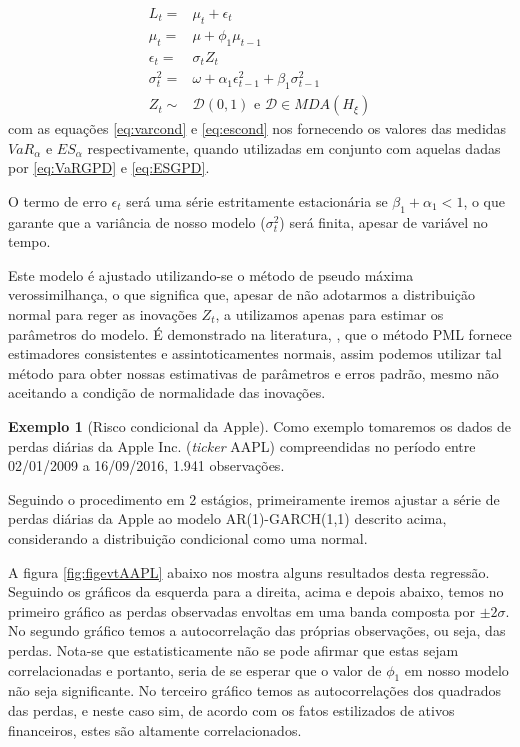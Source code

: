 \documentclass[review]{elsarticle}
\theoremstyle{definition}
\newtheorem{exemplo}[teor]{Exemplo}
\begin{document}
\begin{align}
L_t=&\mu_t+\epsilon_t \\
\mu_t=&\mu+\phi_1 \mu_{t-1} \label{eq:mut} \\
\epsilon_t=&\sigma_t Z_t\\
\sigma_t^2=&\omega+\alpha_1\epsilon_{t-1}^2+\beta_1 \sigma_{t-1}^2 \label{eq:sigma2} \\
Z_t\sim &\mathcal{D}(0,1) \text{ e } \mathcal{D} \in MDA(H_\xi)
\end{align}
com as equações \eqref{eq:varcond} e \eqref{eq:escond} nos fornecendo os valores das medidas $VaR_\alpha$ e $ES_\alpha$ respectivamente, quando utilizadas em conjunto com aquelas dadas por \eqref{eq:VaRGPD} e \eqref{eq:ESGPD}.

O termo de erro $\epsilon_t$ será uma série estritamente estacionária se $\beta_1+\alpha_1<1$, o que garante que a variância de nosso modelo ($\sigma_t^2$) será finita, apesar de variável no tempo.

Este modelo é ajustado utilizando-se o método de pseudo máxima verossimilhança, o que significa que, apesar de não adotarmos a distribuição normal para reger as inovações $Z_t$, a utilizamos apenas para estimar os parâmetros do modelo. É demonstrado na literatura, \cite[Capítulo 4]{Gourieroux1997}, que o método PML fornece estimadores consistentes e assintoticamentes normais, assim podemos utilizar tal método para obter nossas estimativas de parâmetros e erros padrão, mesmo não aceitando a condição de normalidade das inovações.

\begin{exemplo}[Risco condicional da Apple]
	\label{exe:appl}
	Como exemplo tomaremos os dados de perdas diárias da Apple Inc. (\emph{ticker} AAPL) compreendidas no período entre 02/01/2009 a 16/09/2016, 1.941 observações. 
\end{exemplo}

Seguindo o procedimento em 2 estágios, primeiramente iremos ajustar a série de perdas diárias da Apple ao modelo AR(1)-GARCH(1,1) descrito acima, considerando a distribuição condicional como uma normal. 

A figura \ref{fig:figevtAAPL} abaixo nos mostra alguns resultados desta regressão. Seguindo os gráficos da esquerda para a direita, acima e depois abaixo, temos no primeiro gráfico as perdas observadas envoltas em uma banda composta por $\pm 2\sigma$. No segundo gráfico temos a autocorrelação das próprias observações, ou seja, das perdas. Nota-se que estatisticamente não se pode afirmar que estas sejam correlacionadas e portanto, seria de se esperar que o valor de $\phi_1$ em nosso modelo não seja significante. No terceiro gráfico temos as autocorrelações dos quadrados das perdas, e neste caso sim, de acordo com os fatos estilizados de ativos financeiros, estes são altamente correlacionados.
\end{document}
